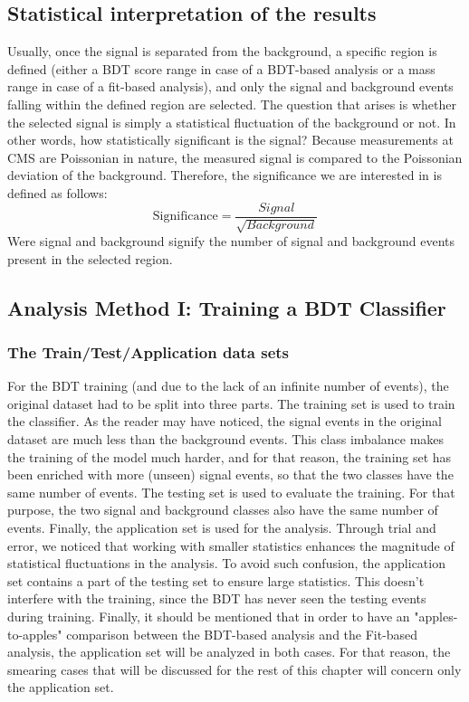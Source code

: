 \subsection{Statistical interpretation of the results}
\label{sec:org544390f}
Usually, once the signal is separated from the background, a specific region is defined (either a BDT score range in case of a BDT-based analysis or a mass range in case of a fit-based analysis), and only the signal and background events falling within the defined region are selected. The question that arises is whether the selected signal is simply a statistical fluctuation of the background or not. In other words, how statistically significant is the signal? Because measurements at CMS are Poissonian in nature, the measured signal is compared to the Poissonian deviation of the background. Therefore, the significance we are interested in is defined as follows:
\begin{equation}
\text{Significance} = \frac{Signal}{\sqrt{Background}}
\end{equation}
Were signal and background signify the number of signal and background events present in the selected region.  
\subsection{Analysis Method I: Training a BDT Classifier}
\label{sec:org2ab78e2}
\subsubsection{The Train/Test/Application data sets}
\label{sec:orgbf7e2cb}
For the BDT training (and due to the lack of an infinite number of events), the original dataset had to be split into three parts. The training set is used to train the classifier. As the reader may have noticed, the signal events in the original dataset are much less than the background events. This class imbalance makes the training of the model much harder, and for that reason, the training set has been enriched with more (unseen) signal events, so that the two classes have the same number of events. The testing set is used to evaluate the training. For that purpose, the two signal and background classes also have the same number of events. Finally, the application set is used for the analysis. Through trial and error, we noticed that working with smaller statistics enhances the magnitude of statistical fluctuations in the analysis. To avoid such confusion, the application set contains a part of the testing set to ensure large statistics. This doesn't interfere with the training, since the BDT has never seen the testing events during training. Finally, it should be mentioned that in order to have an "apples-to-apples" comparison between the BDT-based analysis and the Fit-based analysis, the application set will be analyzed in both cases. For that reason, the smearing cases that will be discussed for the rest of this chapter will concern only the application set.

